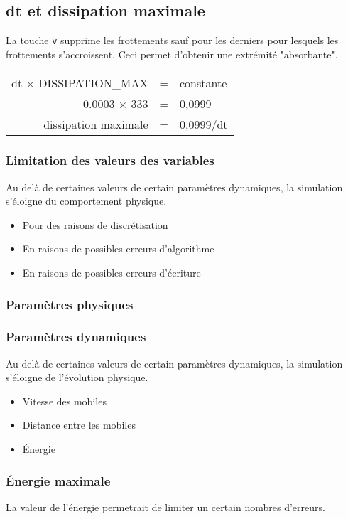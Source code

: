 \subsection{dt et dissipation maximale}
La touche {\texttt v} supprime les frottements sauf pour les derniers pour lesquels les frottements s'accroissent. Ceci permet d'obtenir une extrémité "absorbante".
\begin{center}
	\begin{tabular}{rcl}
	dt $\times$ DISSIPATION\_MAX & = & constante\\
	0.0003 $\times$ 333 & = & 0,0999\\
	dissipation maximale & = & 0,0999/dt\\
	\end{tabular}
\end{center}
%
%
\subsubsection{Limitation des valeurs des variables}
%
Au delà de certaines valeurs de certain paramètres dynamiques, la simulation s'éloigne du comportement physique.
\begin{itemize}[label=, leftmargin=2cm]
\item Pour des raisons de discrétisation
\item En raisons de possibles erreurs d'algorithme
\item En raisons de possibles erreurs d'écriture
\end{itemize}
%
%
\subsubsection{Paramètres physiques}
%
%
\subsubsection{Paramètres dynamiques}
%
Au delà de certaines valeurs de certain paramètres dynamiques, la simulation s'éloigne de l'évolution physique.
\begin{itemize}[label=, leftmargin=2cm]
\item Vitesse des mobiles
\item Distance entre les mobiles
\item Énergie
\end{itemize}
%
\subsubsection{Énergie maximale}
La valeur de l'énergie permetrait de limiter un certain nombres d'erreurs.
%
